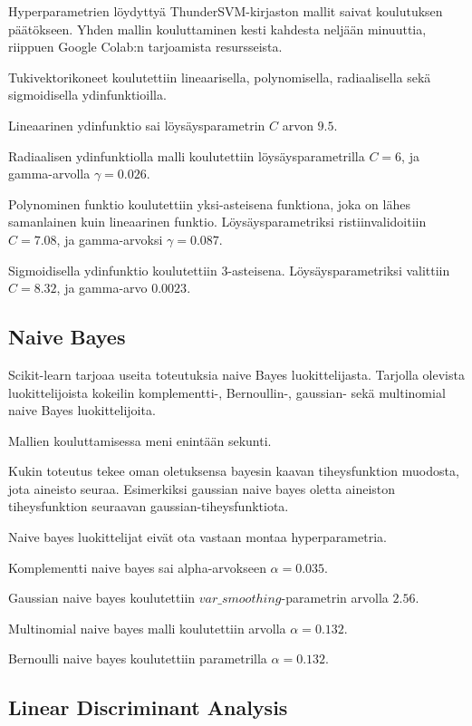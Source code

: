 \documentclass[finnish,twoside,openright]{HYgraduMLDS}
\begin{document}
Hyperparametrien löydyttyä ThunderSVM-kirjaston mallit saivat koulutuksen päätökseen. Yhden mallin kouluttaminen kesti kahdesta neljään minuuttia, riippuen Google Colab:n\cite{google-colab} tarjoamista resursseista.

Tukivektorikoneet koulutettiin lineaarisella, polynomisella, radiaalisella sekä sigmoidisella ydinfunktioilla.

Lineaarinen ydinfunktio sai löysäysparametrin $C$ arvon $9.5$. 

Radiaalisen ydinfunktiolla malli koulutettiin löysäysparametrilla $C = 6$, ja gamma-arvolla $\gamma = 0.026$.

Polynominen funktio koulutettiin yksi-asteisena funktiona, joka on lähes samanlainen kuin lineaarinen funktio. Löysäysparametriksi ristiinvalidoitiin $C = 7.08$, ja gamma-arvoksi $\gamma = 0.087$.

Sigmoidisella ydinfunktio koulutettiin 3-asteisena. Löysäysparametriksi valittiin $C = 8.32$, ja gamma-arvo $0.0023$.


\subsection{Naive Bayes}

Scikit-learn\cite{scikit-learn} tarjoaa useita toteutuksia naive Bayes luokittelijasta. Tarjolla olevista luokittelijoista kokeilin komplementti-, Bernoullin-, gaussian- sekä multinomial naive Bayes luokittelijoita. 

Mallien kouluttamisessa meni enintään sekunti.

Kukin toteutus tekee oman oletuksensa bayesin kaavan tiheysfunktion muodosta, jota aineisto seuraa. Esimerkiksi gaussian naive bayes oletta aineiston tiheysfunktion seuraavan gaussian-tiheysfunktiota.

Naive bayes luokittelijat eivät ota vastaan montaa hyperparametria.

Komplementti naive bayes sai alpha-arvokseen $\alpha = 0.035$.

Gaussian naive bayes koulutettiin $var\_smoothing$-parametrin arvolla $2.56$.

Multinomial naive bayes malli koulutettiin arvolla $\alpha = 0.132$.

Bernoulli naive bayes koulutettiin parametrilla $\alpha = 0.132$.


\subsection{Linear Discriminant Analysis}
\end{document}
